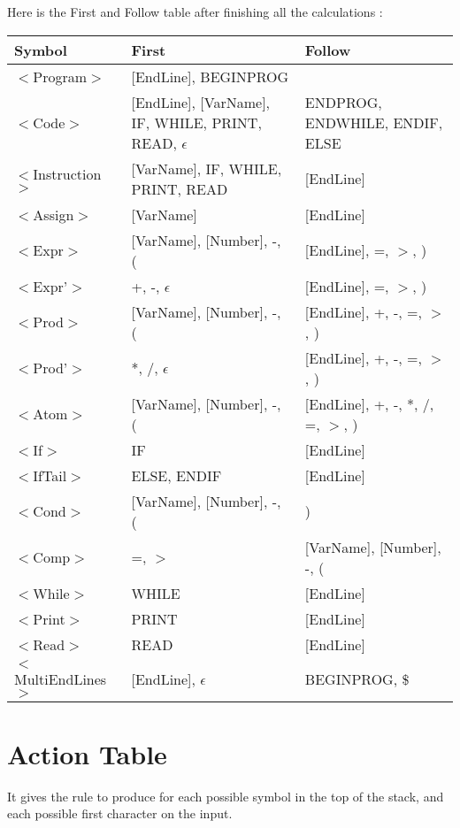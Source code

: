\documentclass{article}
\begin{document}
\noindent Here is the First and Follow table after finishing all the calculations :

\begin{center}
\begin{tabular}{|m{3cm}|m{8cm}|m{6cm}|}
\hline
Symbol & First & Follow \\
\hline\hline
$<$Program$>$ & [EndLine], BEGINPROG & \\
\hline
$<$Code$>$ & [EndLine], [VarName], IF, WHILE, PRINT, READ, $\epsilon$ & ENDPROG, ENDWHILE, ENDIF, ELSE \\
\hline
$<$Instruction$>$ & [VarName], IF, WHILE, PRINT, READ & [EndLine] \\
\hline
$<$Assign$>$ & [VarName] & [EndLine] \\
\hline
$<$Expr$>$ & [VarName], [Number], -, ( & [EndLine], =, $>$, ) \\
\hline
$<$Expr'$>$ & +, -, $\epsilon$ & [EndLine], =, $>$, ) \\
\hline
$<$Prod$>$ & [VarName], [Number], -, ( & [EndLine], +, -, =, $>$, ) \\
\hline
$<$Prod'$>$ & *, /, $\epsilon$ & [EndLine], +, -, =, $>$, ) \\
\hline
$<$Atom$>$ & [VarName], [Number], -, ( & [EndLine], +, -, *, /, =, $>$, ) \\
\hline
$<$If$>$ & IF & [EndLine] \\
\hline
$<$IfTail$>$ & ELSE, ENDIF & [EndLine] \\
\hline
$<$Cond$>$ & [VarName], [Number], -, ( & ) \\
\hline
$<$Comp$>$ & =, $>$ & [VarName], [Number], -, ( \\
\hline
$<$While$>$ & WHILE & [EndLine] \\
\hline
$<$Print$>$ & PRINT & [EndLine] \\
\hline
$<$Read$>$ & READ & [EndLine] \\
\hline
$<$MultiEndLines$>$ & [EndLine], $\epsilon$ & BEGINPROG, \$ \\
\hline
\end{tabular}
\end{center}

\section{Action Table}
It gives the rule to produce for each possible symbol in the top of the stack, and each possible first character on the input. \\
\end{document}
